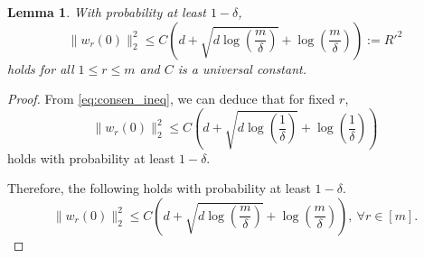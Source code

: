\documentclass{article}
\newtheorem{lemma}{Lemma}
\begin{document}
\begin{lemma}
	With probability at least $1-\delta$,
	\begin{equation}
		\|w_r(0)\|_2^2 \leq C\left(d+\sqrt{d\log\left(\frac{m}{\delta}\right)}+\log\left(\frac{m}{\delta}\right) \right) :=R'^{2}
	\end{equation}
	holds for all $1\le r\le m$ and $C$ is a universal constant.
\end{lemma}
\begin{proof}
	From \cref{eq:consen_ineq}, we can deduce that for fixed $r$,
	\[\|w_r(0)\|_2^2 \leq C\left(d+\sqrt{d\log\left(\frac{1}{\delta}\right)}+\log\left(\frac{1}{\delta}\right) \right)\]
	holds with probability at least $1-\delta$.
	
	Therefore, the following holds with probability at least $1-\delta$.
	\[\|w_r(0)\|_2^2 \leq C\left(d+\sqrt{d\log\left(\frac{m}{\delta}\right)}+\log\left(\frac{m}{\delta}\right) \right), \ \forall r\in[m].\]	
\end{proof}
\end{document}
